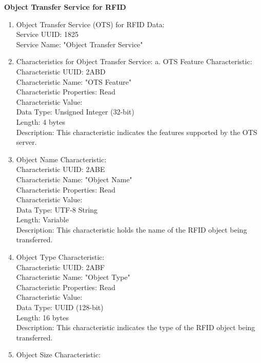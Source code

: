 \documentclass[a4paper,11pt]{article}%
\begin{document}
\textbf{Object Transfer Service for RFID}
\begin{enumerate}
    \item Object Transfer Service (OTS) for RFID Data:\\
          Service UUID: 1825\\
          Service Name: "Object Transfer Service"
    \item Characteristics for Object Transfer Service: a. OTS Feature Characteristic:\\
          Characteristic UUID: 2ABD\\
          Characteristic Name: "OTS Feature"\\
          Characteristic Properties: Read\\
          Characteristic Value:\\
          Data Type: Unsigned Integer (32-bit)\\
          Length: 4 bytes\\
          Description: This characteristic indicates the features supported by the OTS server.
    \item Object Name Characteristic:\\
          Characteristic UUID: 2ABE\\
          Characteristic Name: "Object Name"\\
          Characteristic Properties: Read\\
          Characteristic Value:\\
          Data Type: UTF-8 String\\
          Length: Variable\\
          Description: This characteristic holds the name of the RFID object being transferred.\\
    \item Object Type Characteristic:\\
          Characteristic UUID: 2ABF\\
          Characteristic Name: "Object Type"\\
          Characteristic Properties: Read\\
          Characteristic Value:\\
          Data Type: UUID (128-bit)\\
          Length: 16 bytes\\
          Description: This characteristic indicates the type of the RFID object being transferred.\\
    \item Object Size Characteristic:\\

\end{enumerate}
\end{document}
